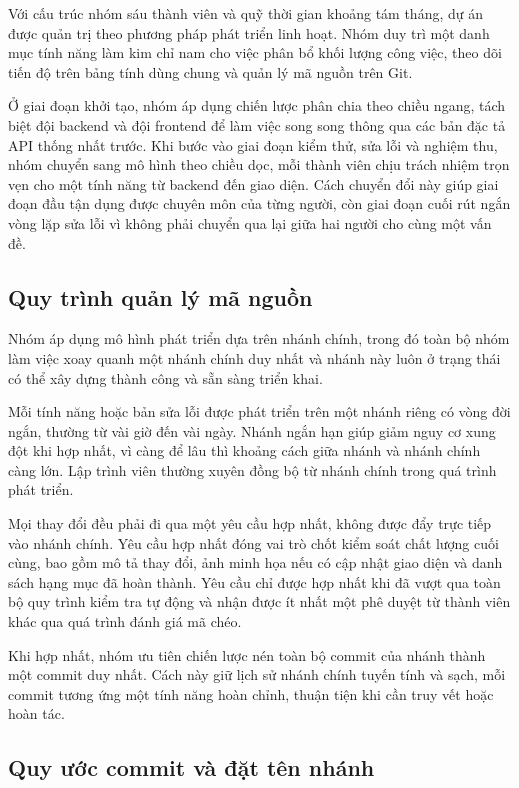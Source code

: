 \documentclass[12pt,a4paper,oneside]{report}
\begin{document}
Với cấu trúc nhóm sáu thành viên và quỹ thời gian khoảng tám tháng, dự án được quản trị theo phương pháp phát triển linh hoạt. Nhóm duy trì một danh mục tính năng làm kim chỉ nam cho việc phân bổ khối lượng công việc, theo dõi tiến độ trên bảng tính dùng chung và quản lý mã nguồn trên Git.

Ở giai đoạn khởi tạo, nhóm áp dụng chiến lược phân chia theo chiều ngang, tách biệt đội backend và đội frontend để làm việc song song thông qua các bản đặc tả API thống nhất trước. Khi bước vào giai đoạn kiểm thử, sửa lỗi và nghiệm thu, nhóm chuyển sang mô hình theo chiều dọc, mỗi thành viên chịu trách nhiệm trọn vẹn cho một tính năng từ backend đến giao diện. Cách chuyển đổi này giúp giai đoạn đầu tận dụng được chuyên môn của từng người, còn giai đoạn cuối rút ngắn vòng lặp sửa lỗi vì không phải chuyển qua lại giữa hai người cho cùng một vấn đề.

\subsection{Quy trình quản lý mã nguồn}

Nhóm áp dụng mô hình phát triển dựa trên nhánh chính, trong đó toàn bộ nhóm làm việc xoay quanh một nhánh chính duy nhất và nhánh này luôn ở trạng thái có thể xây dựng thành công và sẵn sàng triển khai.

Mỗi tính năng hoặc bản sửa lỗi được phát triển trên một nhánh riêng có vòng đời ngắn, thường từ vài giờ đến vài ngày. Nhánh ngắn hạn giúp giảm nguy cơ xung đột khi hợp nhất, vì càng để lâu thì khoảng cách giữa nhánh và nhánh chính càng lớn. Lập trình viên thường xuyên đồng bộ từ nhánh chính trong quá trình phát triển.

Mọi thay đổi đều phải đi qua một yêu cầu hợp nhất, không được đẩy trực tiếp vào nhánh chính. Yêu cầu hợp nhất đóng vai trò chốt kiểm soát chất lượng cuối cùng, bao gồm mô tả thay đổi, ảnh minh họa nếu có cập nhật giao diện và danh sách hạng mục đã hoàn thành. Yêu cầu chỉ được hợp nhất khi đã vượt qua toàn bộ quy trình kiểm tra tự động và nhận được ít nhất một phê duyệt từ thành viên khác qua quá trình đánh giá mã chéo.

Khi hợp nhất, nhóm ưu tiên chiến lược nén toàn bộ commit của nhánh thành một commit duy nhất. Cách này giữ lịch sử nhánh chính tuyến tính và sạch, mỗi commit tương ứng một tính năng hoàn chỉnh, thuận tiện khi cần truy vết hoặc hoàn tác.

\subsection{Quy ước commit và đặt tên nhánh}
\end{document}
